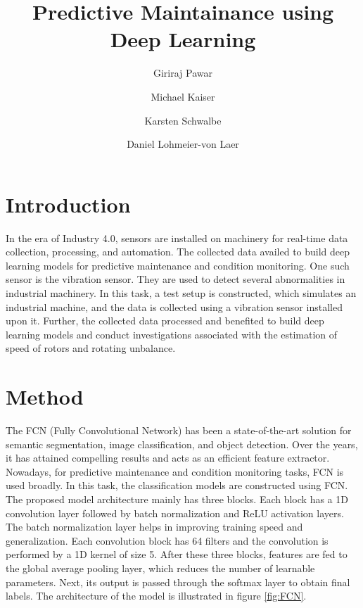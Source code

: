 \documentclass[
  manuscript=report,  %
  layout=preprint,  %
  year=20xx,
  volume=x,
]{extra/joas}
\title{Predictive Maintainance using Deep Learning}
\author{Giriraj Pawar}
\affiliation{FusionSystems GmbH, Chemnitz}
\author{Michael Kaiser}
\affiliation{FusionSystems GmbH, Chemnitz}
\author{Karsten Schwalbe}
\affiliation{FusionSystems GmbH, Chemnitz}
\author{Daniel Lohmeier-von Laer}
\affiliation{FusionSystems GmbH, Chemnitz}
\begin{document}
%  


\section{Introduction}

In the era of Industry 4.0, sensors are installed on machinery for real-time data collection, processing, and automation. The collected data availed to build deep learning models for predictive maintenance and condition monitoring. One such sensor is the vibration sensor. They are used to detect several abnormalities in industrial machinery. In this task, a test setup is constructed, which simulates an industrial machine, and the data is collected using a vibration sensor installed upon it. Further, the collected data processed and benefited to build deep learning models and conduct investigations associated with the estimation of speed of rotors and rotating unbalance.










\section{Method}

The FCN (Fully Convolutional Network) has been a state-of-the-art solution for semantic segmentation, image classification, and object detection. Over the years, it has attained compelling results and acts as an efficient feature extractor\cite{https://doi.org/10.48550/arxiv.1411.4038}. Nowadays, for predictive maintenance and condition monitoring tasks, FCN is used broadly. In this task, the classification models are constructed using FCN. The proposed model architecture mainly has three blocks. Each block has a 1D convolution layer followed by batch normalization and ReLU activation layers. The batch normalization layer helps in improving training speed and generalization. Each convolution block has 64 filters and the convolution is performed by a 1D kernel of size 5. After these three blocks, features are fed to the global average pooling layer, which reduces the number of learnable parameters. Next, its output is passed through the softmax layer to obtain final labels. The architecture of the model is illustrated in figure \ref{fig:FCN}.
\end{document}
